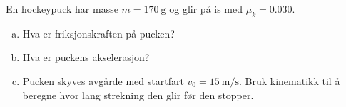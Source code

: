 %
En hockeypuck har masse $m = \SI{170}{\gram}$ og glir på is med $\mu_k = 0.030$.
\begin{enumerate}[a)]
    \item Hva er friksjonskraften på pucken?
    \item Hva er puckens akselerasjon?
    \item Pucken skyves avgårde med startfart $v_0 = \SI{15}{\metre\per\second}$. Bruk kinematikk til å beregne hvor lang strekning den glir før den stopper.
\end{enumerate}
